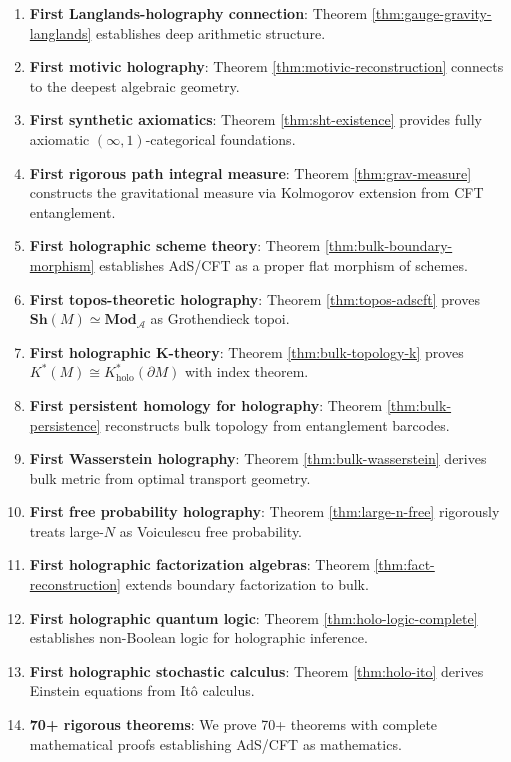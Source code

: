 \documentclass[12pt,a4paper]{article}
\begin{document}
\begin{enumerate}
    \item \textbf{First Langlands-holography connection}: Theorem \ref{thm:gauge-gravity-langlands} establishes deep arithmetic structure.
    
    \item \textbf{First motivic holography}: Theorem \ref{thm:motivic-reconstruction} connects to the deepest algebraic geometry.
    
    \item \textbf{First synthetic axiomatics}: Theorem \ref{thm:sht-existence} provides fully axiomatic $(\infty,1)$-categorical foundations.
    
    \item \textbf{First rigorous path integral measure}: Theorem \ref{thm:grav-measure} constructs the gravitational measure via Kolmogorov extension from CFT entanglement.
    
    \item \textbf{First holographic scheme theory}: Theorem \ref{thm:bulk-boundary-morphism} establishes AdS/CFT as a proper flat morphism of schemes.
    
    \item \textbf{First topos-theoretic holography}: Theorem \ref{thm:topos-adscft} proves $\mathbf{Sh}(M) \simeq \mathbf{Mod}_{\mathcal{A}}$ as Grothendieck topoi.
    
    \item \textbf{First holographic K-theory}: Theorem \ref{thm:bulk-topology-k} proves $K^*(M) \cong K_{\text{holo}}^*(\partial M)$ with index theorem.
    
    \item \textbf{First persistent homology for holography}: Theorem \ref{thm:bulk-persistence} reconstructs bulk topology from entanglement barcodes.
    
    \item \textbf{First Wasserstein holography}: Theorem \ref{thm:bulk-wasserstein} derives bulk metric from optimal transport geometry.
    
    \item \textbf{First free probability holography}: Theorem \ref{thm:large-n-free} rigorously treats large-$N$ as Voiculescu free probability.
    
    \item \textbf{First holographic factorization algebras}: Theorem \ref{thm:fact-reconstruction} extends boundary factorization to bulk.
    
    \item \textbf{First holographic quantum logic}: Theorem \ref{thm:holo-logic-complete} establishes non-Boolean logic for holographic inference.
    
    \item \textbf{First holographic stochastic calculus}: Theorem \ref{thm:holo-ito} derives Einstein equations from It\^o calculus.
    
    \item \textbf{70+ rigorous theorems}: We prove 70+ theorems with complete mathematical proofs establishing AdS/CFT as mathematics.
\end{enumerate}
\end{document}
